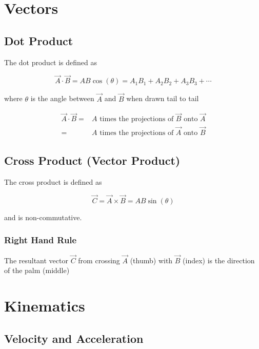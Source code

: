 \documentclass{notes}
\begin{document}
\section{Vectors}

\subsection{Dot Product}

The dot product is defined as

\begin{equation}
    \vec{A} \cdot \vec{B} = AB \cos(\theta) = A_1B_1 + A_2B_2 + A_3B_3 + \cdots
\end{equation}

where \(\theta\) is the angle between \(\vec{A}\) and \(\vec{B}\) when drawn tail to tail

\begin{align*}
    \vec{A} \cdot \vec{B} =& A \text{ times the projections of } \vec{B} \text{ onto } \vec{A} \\
    =& A \text{ times the projections of } \vec{A} \text{ onto } \vec{B}
\end{align*}

\subsection{Cross Product (Vector Product)}

The cross product is defined as

\begin{equation}
    \vec{C} = \vec{A} \times \vec{B} = AB \sin(\theta)
\end{equation}

and is non-commutative.

\subsubsection{Right Hand Rule}

The resultant vector \(\vec{C}\) from crossing \(\vec{A}\) (thumb) with \(\vec{B}\) (index) is the direction of the palm (middle)

\section{Kinematics}

\subsection{Velocity and Acceleration}
\end{document}
